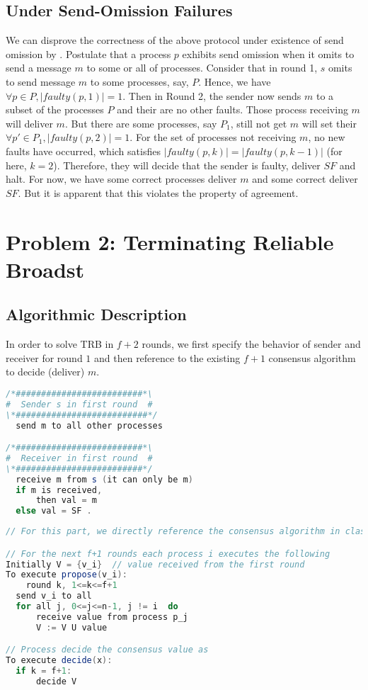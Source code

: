 \documentclass[11pt,a4paper]{article}
\begin{document}
\subsection{Under Send-Omission Failures}
We can disprove the correctness of the above protocol under existence of send
omission by . Postulate that a process $p$ exhibits send omission when it omits
to send a message $m$ to some or all of processes.  
Consider that in round 1, $s$ omits to send message $m$ to some processes,
say, $P$. Hence, we have $\forall p \in P, |faulty(p, 1)| = 1$. Then in Round 2, the sender now sends $m$ to a subset 
of the processes $P$ and their are no other faults. Those process receiving
$m$ will deliver $m$. But there are some processes, say $P_1$, still not get $m$
will set their $\forall p' \in P_1, |faulty(p, 2)| = 1$. For the set of processes not receiving $m$, no new faults have 
occurred, which satisfies $|faulty(p,k)| = |faulty(p,k-1)|$ (for here, $k=2$). Therefore, they
will decide that the sender is faulty, deliver $SF$ and halt.
    For now, we have some correct processes deliver $m$ and some
    correct deliver $SF$. 
    But it is apparent that this violates the property of agreement.
\newpage

\section{Problem 2: Terminating Reliable Broadst}
\subsection{Algorithmic Description}
    In order to solve TRB in $f+2$ rounds, we first specify the behavior of
    sender and receiver for round $1$ and then reference to the existing $f+1$
    consensus algorithm to decide (deliver) $m$. 

\begin{lstlisting}[language=java]
/*#########################*\
#  Sender s in first round  #
\*##########################*/
  send m to all other processes

/*#########################*\
#  Receiver in first round  #
\*#########################*/
  receive m from s (it can only be m)
  if m is received,
      then val = m 
  else val = SF .
\end{lstlisting}

\begin{lstlisting}[language=java]
// For this part, we directly reference the consensus algorithm in class note

// For the next f+1 rounds each process i executes the following 
Initially V = {v_i}  // value received from the first round
To execute propose(v_i):
    round k, 1<=k<=f+1
  send v_i to all
  for all j, 0<=j<=n-1, j != i  do
      receive value from process p_j
      V := V U value

// Process decide the consensus value as
To execute decide(x):
  if k = f+1: 
      decide V
\end{lstlisting}
\end{document}

